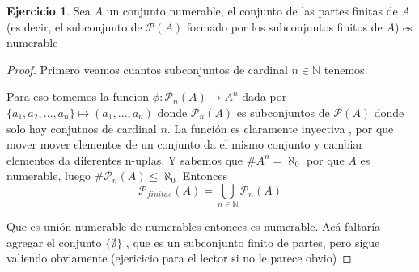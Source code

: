 \documentclass[12pt]{article}
\newcommand{\n}{\aleph_{0}}
\newcommand{\N}{\mathbb{N}}
\newcommand{\ra}{\rightarrow}
\theoremstyle{definition}
\newtheorem{ej}{Ejercicio}
\begin{document}
\noindent
\begin{ej} Sea $A$ un conjunto numerable, el conjunto de las partes finitas de $A$ (es decir, el subconjunto de $\mathcal{P}(A)$ formado por los subconjuntos finitos de $A$) es numerable

\begin{proof}
  Primero veamos cuantos subconjuntos de cardinal $n \in \N$ tenemos.

  Para eso tomemos la funcion $ \phi :  \mathcal{P}_{n}(A) \ra A^n$ dada por $\{a_{1}, a_{2} ,\dots , a_{n}\} \mapsto  (a_{1}, \dots , a_{n}) $ donde $\mathcal{P}_{n}(A)$ es subconjuntos de $\mathcal{P}(A)$ donde solo hay conjutnos de cardinal $n$. La función es claramente inyectiva , por que mover mover elementos de un conjunto da el mismo conjunto y cambiar elementos da diferentes n-uplas. Y sabemos que $\# A^{n} = \n$ por que $A$ es numerable, luego $\# \mathcal{P}_{n}(A) \leq \n$
  Entonces $$ \mathcal{P}_{finitas}(A) = \bigcup_{n \in \N} \mathcal{P}_{n}(A)$$

  Que es unión numerable de numerables entonces es numerable. Acá faltaría agregar el conjunto $\{\emptyset\}$ , que es un subconjunto finito de partes, pero sigue valiendo obviamente (ejericicio para el lector si no le parece obvio)
\end{proof}
\end{ej}
\end{document}

